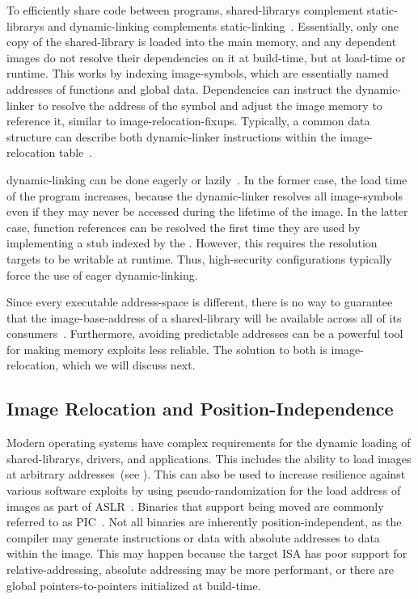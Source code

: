 To efficiently share code between programs, \glspl{shared-library} complement \glspl{static-library} and \gls{dynamic-linking} complements \gls{static-linking}~\cite{levine2000linkers}. Essentially, only one copy of the \gls{shared-library} is loaded into the main memory, and any dependent \glspl{image} do not resolve their dependencies on it at build-time, but at load-time or runtime. This works by indexing \glspl{image-symbol}, which are essentially named addresses of functions and global data. Dependencies can instruct the \gls{dynamic-linker} to resolve the address of the symbol and adjust the \gls{image} memory to reference it, similar to \glspl{image-relocation-fixup}. Typically, a common data structure can describe both \gls{dynamic-linker} instructions within the \gls{image-relocation} table~\cite{elf-spec,macho-spec}.

\Gls{dynamic-linking} can be done eagerly or lazily~\cite{levine2000linkers}. In the former case, the load time of the program increases, because the \gls{dynamic-linker} resolves all \glspl{image-symbol} even if they may never be accessed during the lifetime of the \gls{image}. In the latter case, function references can be resolved the first time they are used by implementing a stub indexed by the . However, this requires the resolution targets to be writable at runtime. Thus, high-security configurations typically force the use of eager \gls{dynamic-linking}.

Since every executable \gls{address-space} is different, there is no way to guarantee that the \gls{image-base-address} of a \gls{shared-library} will be available across all of its consumers~\cite{ms-dll-base-addr}. Furthermore, avoiding predictable addresses can be a powerful tool for making memory exploits less reliable. The solution to both is \gls{image-relocation}, which we will discuss next.

\subsection{Image Relocation and Position-Independence}
\label{sec:reloc}

Modern operating systems have complex requirements for the dynamic loading of \glspl{shared-library}, drivers, and applications. This includes the ability to load \glspl{image} at arbitrary addresses~(see ). This can also be used to increase resilience against various software exploits by using \gls{pseudo-randomization} for the load address of \glspl{image} as part of \gls{ASLR}~\cite{app9142928}. Binaries that support being moved are commonly referred to as \gls{PIC}~\cite{levine2000linkers}. Not all binaries are inherently position-independent, as the compiler may generate  instructions or data with absolute addresses to data within the \gls{image}. This may happen because the target \gls{ISA} has poor support for \gls{relative-addressing}, absolute addressing may be more performant, or there are global pointers-to-pointers initialized at build-time.

